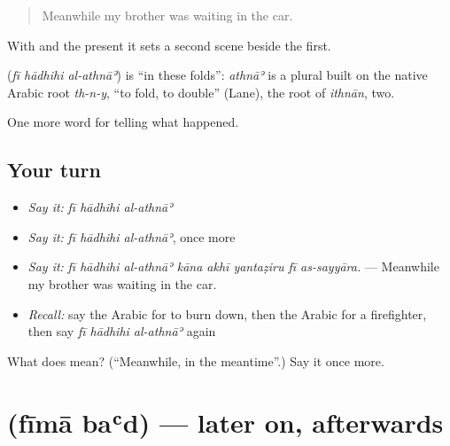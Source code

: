 \begin{quote}
Meanwhile my brother was waiting in the car.
\end{quote}

With  and the present it sets a second scene beside the first.

\begin{cousinweb}
\textbf{  } (\emph{fī hādhihi al-athnāʾ}) is \textquotedblleft{}in these folds\textquotedblright{}: \emph{athnāʾ} is a plural built on the native Arabic root \emph{th-n-y}, \textquotedblleft{}to fold, to double\textquotedblright{} (Lane), the root of \emph{ithnān}, two.
\end{cousinweb}

\begin{grammarlens}[title={What you've built}]
One more word for telling what happened.
\end{grammarlens}

\subsection*{Your turn}
\begin{itemize}
\raggedright
  \item \emph{Say it:} \emph{fī hādhihi al-athnāʾ}
  \item \emph{Say it:} \emph{fī hādhihi al-athnāʾ}, once more
  \item \emph{Say it:} \emph{fī hādhihi al-athnāʾ kāna akhī yantaẓiru fī as-sayyāra.} — Meanwhile my brother was waiting in the car.
  \item \emph{Recall:} say the Arabic for to burn down, then the Arabic for a firefighter, then say \emph{fī hādhihi al-athnāʾ} again
\end{itemize}

\begin{tcolorbox}[breakable,colback=teal!4,colframe=teal!35!black,title={Before you move on}]
What does    mean? (\textquotedblleft{}Meanwhile, in the meantime\textquotedblright{}.) Say it once more.
\end{tcolorbox}
\section[\texorpdfstring{\ar{فيما} \ar{بعد} (fīmā baʿd)}{فيما بعد (fīmā baʿd)}]{  (fīmā baʿd) — later on, afterwards}

\label{lesson:AR-C299-fima-bad}



